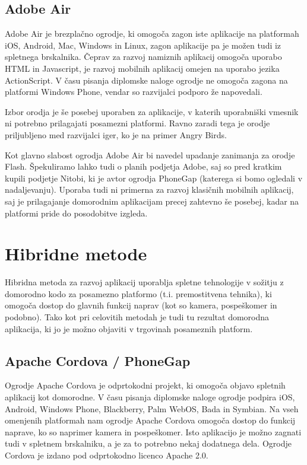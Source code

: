 \subsection{Adobe Air}

Adobe Air\cite{adobeair} je brezplačno ogrodje, ki omogoča zagon iste aplikacije na platformah iOS, Android, Mac, Windows in Linux, zagon aplikacije pa je možen tudi iz spletnega brskalnika. Čeprav za razvoj namiznih aplikacij omogoča uporabo HTML in Javascript, je razvoj mobilnih aplikacij omejen na uporabo jezika ActionScript. V času pisanja diplomske naloge ogrodje ne omogoča zagona na platformi Windows Phone, vendar so razvijalci podporo že napovedali.

Izbor orodja je še posebej uporaben za aplikacije, v katerih uporabniški vmesnik ni potrebno prilagajati posamezni platformi. Ravno zaradi tega je orodje priljubljeno med razvijalci iger, ko je na primer Angry Birds\cite{angrybirds}.

Kot glavno slabost ogrodja Adobe Air bi navedel upadanje zanimanja za orodje Flash. Špekuliramo lahko tudi o planih podjetja Adobe, saj so pred kratkim kupili podjetje Nitobi, ki je avtor ogrodja PhoneGap (katerega si bomo ogledali v nadaljevanju). Uporaba tudi ni primerna za razvoj klasičnih mobilnih aplikacij, saj je prilagajanje domorodnim aplikacijam precej zahtevno še posebej, kadar na platformi pride do posodobitve izgleda.

\section{Hibridne metode}

Hibridna metoda za razvoj aplikacij uporablja spletne tehnologije v sožitju z domorodno kodo za posamezno platformo (t.i. premostitvena tehnika), ki omogoča dostop do glavnih funkcij naprav (kot so kamera, pospeškomer in podobno). Tako kot pri celovitih metodah je tudi tu rezultat domorodna aplikacija, ki jo je možno objaviti v trgovinah posameznih platform.

\subsection{Apache Cordova / PhoneGap}

Ogrodje Apache Cordova\cite{cordova} je odprtokodni projekt, ki omogoča objavo spletnih aplikacij kot domorodne\cite{web-vs-native}. V času pisanja diplomske naloge ogrodje podpira iOS, Android, Windows Phone, Blackberry, Palm WebOS, Bada in Symbian. Na vseh omenjenih platformah nam ogrodje Apache Cordova omogoča dostop do funkcij naprave, ko so naprimer kamera in pospeškomer. Isto aplikacijo je možno zagnati tudi v spletnem brskalniku, a je za to potrebno nekaj dodatnega dela. Ogrodje Cordova je izdano pod odprtokodno licenco Apache 2.0\cite{apache-licence}.

